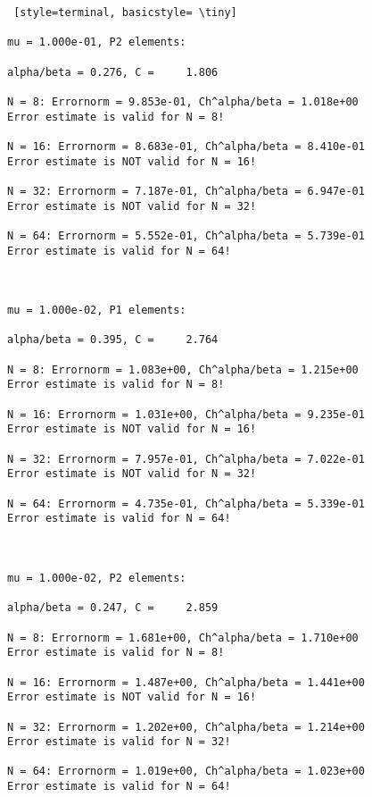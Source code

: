 \documentclass[a4paper,english,12pt,twoside]{article}
\begin{document}
\begin{lstlisting} [style=terminal, basicstyle= \tiny]

mu = 1.000e-01, P2 elements:

alpha/beta = 0.276, C =     1.806

N = 8: Errornorm = 9.853e-01, Ch^alpha/beta = 1.018e+00
Error estimate is valid for N = 8!

N = 16: Errornorm = 8.683e-01, Ch^alpha/beta = 8.410e-01
Error estimate is NOT valid for N = 16!

N = 32: Errornorm = 7.187e-01, Ch^alpha/beta = 6.947e-01
Error estimate is NOT valid for N = 32!

N = 64: Errornorm = 5.552e-01, Ch^alpha/beta = 5.739e-01
Error estimate is valid for N = 64!



mu = 1.000e-02, P1 elements:

alpha/beta = 0.395, C =     2.764

N = 8: Errornorm = 1.083e+00, Ch^alpha/beta = 1.215e+00
Error estimate is valid for N = 8!

N = 16: Errornorm = 1.031e+00, Ch^alpha/beta = 9.235e-01
Error estimate is NOT valid for N = 16!

N = 32: Errornorm = 7.957e-01, Ch^alpha/beta = 7.022e-01
Error estimate is NOT valid for N = 32!

N = 64: Errornorm = 4.735e-01, Ch^alpha/beta = 5.339e-01
Error estimate is valid for N = 64!



mu = 1.000e-02, P2 elements:

alpha/beta = 0.247, C =     2.859

N = 8: Errornorm = 1.681e+00, Ch^alpha/beta = 1.710e+00
Error estimate is valid for N = 8!

N = 16: Errornorm = 1.487e+00, Ch^alpha/beta = 1.441e+00
Error estimate is NOT valid for N = 16!

N = 32: Errornorm = 1.202e+00, Ch^alpha/beta = 1.214e+00
Error estimate is valid for N = 32!

N = 64: Errornorm = 1.019e+00, Ch^alpha/beta = 1.023e+00
Error estimate is valid for N = 64!

\end{lstlisting}
\end{document}
